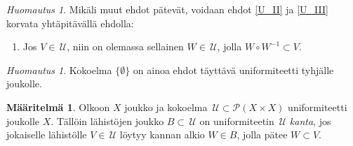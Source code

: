 \documentclass[12pt,a4paper,leqno]{report}
\newcommand{\U}{\,\mathcal{U}}
\newcommand{\Pot}{\mathcal{P}}
\theoremstyle{plain}
\newtheorem{kor}[equation]{Korollaari}
\theoremstyle{definition}
\newtheorem{maar}[equation]{Määritelmä}
\theoremstyle{remark}
\newtheorem{huom}[equation]{Huomautus}
\begin{document}
\begin{huom}\label{UaHuom}
Mikäli muut ehdot pätevät, voidaan ehdot \ref{U_II} ja \ref{U_III} korvata yhtäpitävällä ehdolla: 
\begin{enumerate} [label=(Ua),ref=(Ua)]
\item \label{Uaehto} 
Jos $V\in \U$, niin on olemassa sellainen $W\in \U$, jolla $ W\circ W^{-1}\subset V$.
\end{enumerate}
%
\end{huom}
\begin{huom}
Kokoelma $\{\emptyset\}$ on ainoa ehdot täyttävä uniformiteetti tyhjälle joukolle.
\end{huom}
\begin{maar}\label{uniformi_kanta}
Olkoon $X$ joukko ja kokoelma $\U\subset \Pot (X\times X)$ uniformiteetti 
joukolle $X$. Tällöin lähistöjen joukko $B\subset \U$ on 
uniformiteetin $\U$ \emph{kanta}, jos jokaiselle lähistölle $V\in\U$ löytyy 
kannan alkio $W\in B$, jolla pätee $W\subset V$.
\end{maar}
\end{document}
